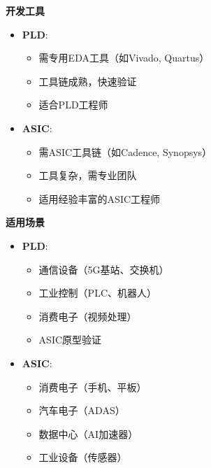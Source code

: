 \documentclass[
  ignorenonframetext,
  chinese,
]{beamer}
\providecommand{\tightlist}{%
  \setlength{\itemsep}{0pt}\setlength{\parskip}{0pt}}
\begin{document}
\begin{frame}
\textbf{开发工具}

\begin{itemize}
\tightlist
\item
  \textbf{PLD}:

  \begin{itemize}
  \tightlist
  \item
    需专用EDA工具（如Vivado, Quartus）\\
  \item
    工具链成熟，快速验证\\
  \item
    适合PLD工程师\\
  \end{itemize}
\item
  \textbf{ASIC}:

  \begin{itemize}
  \tightlist
  \item
    需ASIC工具链（如Cadence, Synopsys）\\
  \item
    工具复杂，需专业团队\\
  \item
    适用经验丰富的ASIC工程师
  \end{itemize}
\end{itemize}
\end{frame}

\begin{frame}
\textbf{适用场景}

\begin{itemize}
\tightlist
\item
  \textbf{PLD}:

  \begin{itemize}
  \tightlist
  \item
    通信设备（5G基站、交换机）\\
  \item
    工业控制（PLC、机器人）\\
  \item
    消费电子（视频处理）\\
  \item
    ASIC原型验证\\
  \end{itemize}
\item
  \textbf{ASIC}:

  \begin{itemize}
  \tightlist
  \item
    消费电子（手机、平板）\\
  \item
    汽车电子（ADAS）\\
  \item
    数据中心（AI加速器）\\
  \item
    工业设备（传感器）
  \end{itemize}
\end{itemize}
\end{frame}
\end{document}
